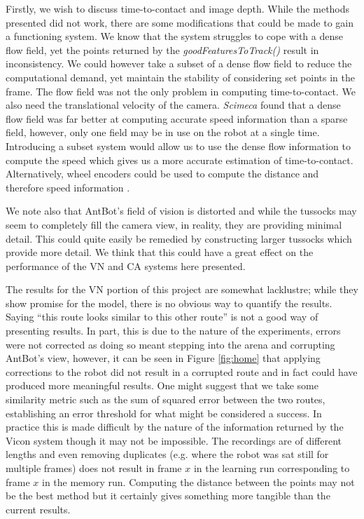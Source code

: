 \documentclass[a4paper,12pt,twoside,openright]{article}
\begin{document}
Firstly, we wish to discuss time-to-contact and image depth. While the methods presented did not work, there are
some modifications that could be made to gain a functioning system. We know that the system struggles to cope
with a dense flow field, yet the points returned by the \textit{goodFeaturesToTrack()} result in inconsistency. We
could however take a subset of a dense flow field to reduce the computational demand, yet maintain the stability of
considering set points in the frame. The flow field was not the only problem in computing time-to-contact. We also
need the translational velocity of the camera. \textit{Scimeca} found that a dense flow field was far better at
computing accurate speed information than a sparse field, however, only one field may be in use on the robot at
a single time. Introducing a subset system would allow us to use the dense flow information to compute the speed
which gives us a more accurate estimation of time-to-contact. Alternatively, wheel encoders could be used to compute the
distance and therefore speed information \cite{Wittlinger1965}.
\newline

We note also that AntBot's field of vision is distorted and while the tussocks may seem to completely
fill the camera view, in reality, they are providing minimal detail. This could quite easily be remedied by
constructing larger tussocks which provide more detail. We think that this could have a great effect on the
performance of the VN and CA systems here presented.
\newline

The results for the VN portion of this project are somewhat lacklustre; while they show promise for the model,
there is no obvious way to quantify the results. Saying ``this route looks similar to this other route'' is
not a good way of presenting results. In part, this is due to the nature of the experiments, errors were
not corrected as doing so meant stepping into the arena and corrupting AntBot's view, however, it can
be seen in Figure \ref{fig:home} that applying corrections to the robot did not result in a corrupted route
and in fact could have produced more meaningful results. One might suggest that we take some similarity metric
such as the sum of squared error between the two routes, establishing an error threshold for what might be
considered a success. In practice this is made difficult by the nature of the information returned by the
Vicon system though it may not be impossible. The recordings are of different lengths and even removing
duplicates (e.g. where the robot was sat still for multiple frames) does not result in frame $x$ in the
learning run corresponding to frame $x$ in the memory run. Computing the distance between the points
may not be the best method but it certainly gives something more tangible than the current results.
\newline
\end{document}
